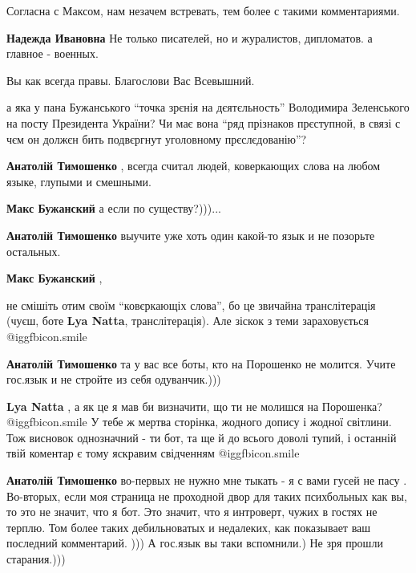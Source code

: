 \begin{itemize}
\begin{itemize}
Согласна с Максом, нам незачем встревать, тем более с такими комментариями.

\textbf{Надежда Ивановна} Не только писателей, но и журалистов, дипломатов. а главное - военных.

Вы как всегда правы. Благослови Вас Всевышний.
\end{itemize} %


а яка у пана Бужанського \enquote{точка зрєнія на дєятєльность} Володимира Зеленського
на посту Президента України? Чи має вона \enquote{ряд прізнаков прєступной, в связі с
чєм он должєн бить подвєргнут уголовному прєслєдованію}?

\begin{itemize} %
\textbf{Анатолій Тимошенко} , всегда считал людей, коверкающих слова на любом языке, глупыми и смешными.

\textbf{Макс Бужанский} а если по существу?)))...

\textbf{Анатолій Тимошенко} выучите уже хоть один какой-то язык и не позорьте остальных.

\textbf{Макс Бужанский} , 

не смішіть отим своїм \enquote{ковєркающіх слова}, бо це звичайна транслітерація (чуєш,
боте \textbf{Lya Natta}, транслітерація). Але зіскок з теми зараховується  @igg{fbicon.smile} 


\textbf{Анатолій Тимошенко} та у вас все боты, кто на Порошенко не молится. Учите гос.язык и не стройте из себя одуванчик.)))

\textbf{Lya Natta} , а як це я мав би визначити, що ти не молишся на Порошенка?  @igg{fbicon.smile}  У тебе ж мертва сторінка, жодного допису і жодної світлини. Тож висновок однозначний - ти бот, та ще й до всього доволі тупий, і останній твій коментар є тому яскравим свідченням  @igg{fbicon.smile} 

\textbf{Анатолій Тимошенко} во-первых не нужно мне тыкать - я с вами гусей не пасу . Во-вторых, если моя страница не проходной двор для таких психбольных как вы, то это не значит, что я бот. Это значит, что я интроверт, чужих в гостях не терплю. Том более таких дебильноватых и недалеких, как показывает ваш последний комментарий. )))
А гос.язык вы таки вспомнили.) Не зря прошли старания.)))


\end{itemize}
\end{itemize}
